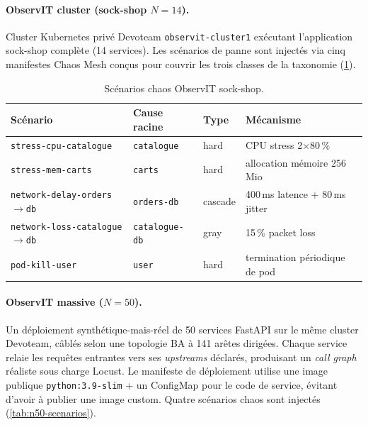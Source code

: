 \documentclass[a4paper,11pt,oneside]{report}
\begin{document}
\paragraph{ObservIT cluster (sock-shop $N{=}14$).} Cluster Kubernetes priv\'e Devoteam \texttt{observit-cluster1} ex\'ecutant l'application sock-shop compl\`ete (14 services). Les sc\'enarios de panne sont inject\'es via cinq manifestes Chaos Mesh con\c{c}us pour couvrir les trois classes de la taxonomie (\cref{tab:sockshop-scenarios}).

\begin{table}[ht]
\centering
\caption{Sc\'enarios chaos ObservIT sock-shop.}
\label{tab:sockshop-scenarios}
\begin{tabular}{llll}
\toprule
Sc\'enario & Cause racine & Type & M\'ecanisme \\
\midrule
\texttt{stress-cpu-catalogue} & \texttt{catalogue} & hard & CPU stress 2$\times$80\,\% \\
\texttt{stress-mem-carts} & \texttt{carts} & hard & allocation m\'emoire 256\,Mio \\
\texttt{network-delay-orders$\to$db} & \texttt{orders-db} & cascade & 400\,ms latence + 80\,ms jitter \\
\texttt{network-loss-catalogue$\to$db} & \texttt{catalogue-db} & gray & 15\,\% packet loss \\
\texttt{pod-kill-user} & \texttt{user} & hard & termination p\'eriodique de pod \\
\bottomrule
\end{tabular}
\end{table}

\paragraph{ObservIT massive ($N{=}50$).} Un d\'eploiement synth\'etique-mais-r\'eel de 50 services FastAPI sur le m\^eme cluster Devoteam, c\^abl\'es selon une topologie BA \`a 141 ar\^etes dirig\'ees. Chaque service relaie les requ\^etes entrantes vers ses \emph{upstreams} d\'eclar\'es, produisant un \emph{call graph} r\'ealiste sous charge Locust. Le manifeste de d\'eploiement utilise une image publique \texttt{python:3.9-slim} + un ConfigMap pour le code de service, \'evitant d'avoir \`a publier une image custom. Quatre sc\'enarios chaos sont inject\'es (\cref{tab:n50-scenarios}).
\end{document}
